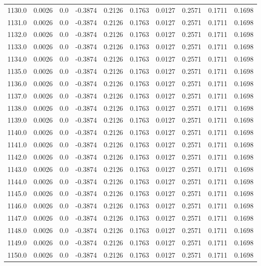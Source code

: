 \begin{longtable}{lrrrrrrrrr}
1130.0 & 0.0026 & 0.0 & -0.3874 & 0.2126 & 0.1763 & 0.0127 & 0.2571 & 0.1711 & 0.1698 \\
1131.0 & 0.0026 & 0.0 & -0.3874 & 0.2126 & 0.1763 & 0.0127 & 0.2571 & 0.1711 & 0.1698 \\
1132.0 & 0.0026 & 0.0 & -0.3874 & 0.2126 & 0.1763 & 0.0127 & 0.2571 & 0.1711 & 0.1698 \\
1133.0 & 0.0026 & 0.0 & -0.3874 & 0.2126 & 0.1763 & 0.0127 & 0.2571 & 0.1711 & 0.1698 \\
1134.0 & 0.0026 & 0.0 & -0.3874 & 0.2126 & 0.1763 & 0.0127 & 0.2571 & 0.1711 & 0.1698 \\
1135.0 & 0.0026 & 0.0 & -0.3874 & 0.2126 & 0.1763 & 0.0127 & 0.2571 & 0.1711 & 0.1698 \\
1136.0 & 0.0026 & 0.0 & -0.3874 & 0.2126 & 0.1763 & 0.0127 & 0.2571 & 0.1711 & 0.1698 \\
1137.0 & 0.0026 & 0.0 & -0.3874 & 0.2126 & 0.1763 & 0.0127 & 0.2571 & 0.1711 & 0.1698 \\
1138.0 & 0.0026 & 0.0 & -0.3874 & 0.2126 & 0.1763 & 0.0127 & 0.2571 & 0.1711 & 0.1698 \\
1139.0 & 0.0026 & 0.0 & -0.3874 & 0.2126 & 0.1763 & 0.0127 & 0.2571 & 0.1711 & 0.1698 \\
1140.0 & 0.0026 & 0.0 & -0.3874 & 0.2126 & 0.1763 & 0.0127 & 0.2571 & 0.1711 & 0.1698 \\
1141.0 & 0.0026 & 0.0 & -0.3874 & 0.2126 & 0.1763 & 0.0127 & 0.2571 & 0.1711 & 0.1698 \\
1142.0 & 0.0026 & 0.0 & -0.3874 & 0.2126 & 0.1763 & 0.0127 & 0.2571 & 0.1711 & 0.1698 \\
1143.0 & 0.0026 & 0.0 & -0.3874 & 0.2126 & 0.1763 & 0.0127 & 0.2571 & 0.1711 & 0.1698 \\
1144.0 & 0.0026 & 0.0 & -0.3874 & 0.2126 & 0.1763 & 0.0127 & 0.2571 & 0.1711 & 0.1698 \\
1145.0 & 0.0026 & 0.0 & -0.3874 & 0.2126 & 0.1763 & 0.0127 & 0.2571 & 0.1711 & 0.1698 \\
1146.0 & 0.0026 & 0.0 & -0.3874 & 0.2126 & 0.1763 & 0.0127 & 0.2571 & 0.1711 & 0.1698 \\
1147.0 & 0.0026 & 0.0 & -0.3874 & 0.2126 & 0.1763 & 0.0127 & 0.2571 & 0.1711 & 0.1698 \\
1148.0 & 0.0026 & 0.0 & -0.3874 & 0.2126 & 0.1763 & 0.0127 & 0.2571 & 0.1711 & 0.1698 \\
1149.0 & 0.0026 & 0.0 & -0.3874 & 0.2126 & 0.1763 & 0.0127 & 0.2571 & 0.1711 & 0.1698 \\
1150.0 & 0.0026 & 0.0 & -0.3874 & 0.2126 & 0.1763 & 0.0127 & 0.2571 & 0.1711 & 0.1698 \\

\end{longtable}
